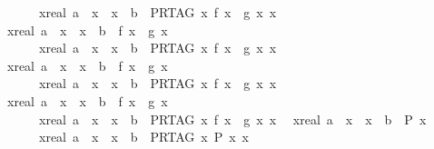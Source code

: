 \begin{isabellebody}
\ \ \ \ \ \ \ {\isacharparenleft}{\isasymforall}x{\isacharcolon}{\isacharcolon}real{\isachardot}\ a\ {\isacharless}\ x\ {\isasymand}\ x\ {\isasymle}\ b\ {\isasymlongrightarrow}\ PR{\isacharunderscore}TAG\ {\isacharparenleft}{\isasymlambda}x{\isachardot}\ f\ x\ {\isacharless}\ g\ x{\isacharparenright}\ x{\isacharparenright}{\isachardoublequoteclose}\isanewline
\ \ {\isachardoublequoteopen}{\isacharparenleft}{\isasymforall}x{\isacharcolon}{\isacharcolon}real{\isachardot}\ a\ {\isasymle}\ x\ {\isasymand}\ x\ {\isasymle}\ b\ {\isasymlongrightarrow}\ f\ x\ {\isacharless}\ g\ x{\isacharparenright}\ {\isacharequal}\ \isanewline
\ \ \ \ \ \ \ {\isacharparenleft}{\isasymforall}x{\isacharcolon}{\isacharcolon}real{\isachardot}\ a\ {\isasymle}\ x\ {\isasymand}\ x\ {\isasymle}\ b\ {\isasymlongrightarrow}\ PR{\isacharunderscore}TAG\ {\isacharparenleft}{\isasymlambda}x{\isachardot}\ f\ x\ {\isacharless}\ g\ x{\isacharparenright}\ x{\isacharparenright}{\isachardoublequoteclose}\isanewline
\ \ {\isachardoublequoteopen}{\isacharparenleft}{\isasymforall}x{\isacharcolon}{\isacharcolon}real{\isachardot}\ a\ {\isacharless}\ x\ {\isasymand}\ x\ {\isacharless}\ b\ {\isasymlongrightarrow}\ f\ x\ {\isacharless}\ g\ x{\isacharparenright}\ {\isacharequal}\ \isanewline
\ \ \ \ \ \ \ {\isacharparenleft}{\isasymforall}x{\isacharcolon}{\isacharcolon}real{\isachardot}\ a\ {\isacharless}\ x\ {\isasymand}\ x\ {\isacharless}\ b\ {\isasymlongrightarrow}\ PR{\isacharunderscore}TAG\ {\isacharparenleft}{\isasymlambda}x{\isachardot}\ f\ x\ {\isacharless}\ g\ x{\isacharparenright}\ x{\isacharparenright}{\isachardoublequoteclose}\isanewline
\ \ {\isachardoublequoteopen}{\isacharparenleft}{\isasymforall}x{\isacharcolon}{\isacharcolon}real{\isachardot}\ a\ {\isasymle}\ x\ {\isasymand}\ x\ {\isacharless}\ b\ {\isasymlongrightarrow}\ f\ x\ {\isacharless}\ g\ x{\isacharparenright}\ {\isacharequal}\ \isanewline
\ \ \ \ \ \ \ {\isacharparenleft}{\isasymforall}x{\isacharcolon}{\isacharcolon}real{\isachardot}\ a\ {\isasymle}\ x\ {\isasymand}\ x\ {\isacharless}\ b\ {\isasymlongrightarrow}\ PR{\isacharunderscore}TAG\ {\isacharparenleft}{\isasymlambda}x{\isachardot}\ f\ x\ {\isacharless}\ g\ x{\isacharparenright}\ x{\isacharparenright}{\isachardoublequoteclose}\isanewline
\ \ {\isachardoublequoteopen}{\isacharparenleft}{\isasymforall}x{\isacharcolon}{\isacharcolon}real{\isachardot}\ a\ {\isacharless}\ x\ {\isasymand}\ x\ {\isasymle}\ b\ {\isasymlongrightarrow}\ P\ x{\isacharparenright}\ {\isacharequal}\ \isanewline
\ \ \ \ \ \ \ {\isacharparenleft}{\isasymforall}x{\isacharcolon}{\isacharcolon}real{\isachardot}\ a\ {\isacharless}\ x\ {\isasymand}\ x\ {\isasymle}\ b\ {\isasymlongrightarrow}\ {\isasymnot}{\isacharparenleft}PR{\isacharunderscore}TAG\ {\isacharparenleft}{\isasymlambda}x{\isachardot}\ {\isasymnot}P\ x{\isacharparenright}{\isacharparenright}\ x{\isacharparenright}{\isachardoublequoteclose}\isanewline

\end{isabellebody}
